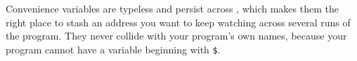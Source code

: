 \begin{note}
	Convenience variables are typeless and persist across , which makes
	them the right place to stash an address you want to keep watching across
	several runs of the program. They never collide with your program's own names,
	because your program cannot have a variable beginning with \texttt{\$}.
\end{note}

